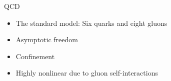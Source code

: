 \documentclass[10pt,show notes on second screen]{beamer}
\begin{document}
\begin{frame}{QCD}
\begin{itemize}[<+->]
    \item The standard model: Six quarks and eight gluons
    \item Asymptotic freedom
    \item Confinement
    \item Highly nonlinear due to gluon self-interactions
\end{itemize}





\end{frame}
\end{document}
